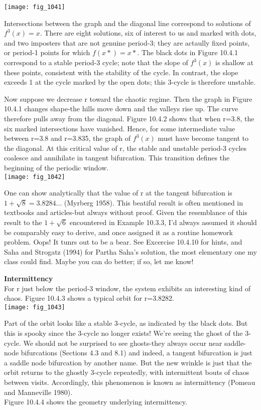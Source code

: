 \documentclass{article}
\newcommand\tab[1][1cm]{\hspace*{#1}}
\begin{document}
\texttt{[image: fig\_1041]}

Intersections between the graph and the diagonal line correspond to solutions of $f^{3}(x)=x$. There are eight solutions, six of interest to us and marked with dots, and two imposters that are not genuine period-3; they are actaully fixed points, or period-1 points for which $f(x*)=x*$. The black dots in Figure 10.4.1 correspond to a stable period-3 cycle; note that the slope of $f^{3}(x)$ is shallow at these points, consistent with the stability of the cycle. In contrast, the slope exceeds 1 at the cycle marked by the open dots; this 3-cycle is therefore unstable. \\ \tab

Now suppose we decrease r toward the chaotic regime. Then the graph in Figure 10.4.1 changes shape-the hills move down and the valleys rise up. The curve therefore pulls away from the diagonal. Figure 10.4.2 shows that when r=3.8, the six marked intersections have vanished. Hence, for some intermediate value between r=3.8 and r=3.835, the graph of $f^{3}(x)$ must have become tangent to the diagonal. At this critical value of r, the stable and unstable period-3 cycles coalesce and annihilate in tangent bifurcation. This transition defines the beginning of the periodic window. \\

\texttt{[image: fig\_1042]}

\tab One can show analytically that the value of r at the tangent bifurcation is $1+\sqrt{8}=3.8284$... (Myrberg 1958). This beatiful result is often mentioned in textbooks and articles-but always without proof. Given the resemblance of this result to the $1+\sqrt{6}$ encountered in Example 10.3.3, I'd always assumed it should be comparably easy to derive, and once assigned it as a routine homework problem. Oops! It tunrs out to be a bear. See Excercise 10.4.10 for hints, and Saha and Strogatz (1994) for Partha Saha's solution, the most elementary one my class could find. Maybe you can do better; if so, let me know! 

\textbf{Intermittency} \\
For r just below the period-3 window, the system exhibits an interesting kind of chaos. Figure 10.4.3 shows a typical orbit for r=3.8282. \\

\texttt{[image: fig\_1043]}

Part of the orbit looks like a stable 3-cycle, as indicated by the black dots. But this is spooky since the 3-cycle no longer exists! We're seeing the ghost of the 3-cycle. We should not be surprised to see ghosts-they always occur near saddle-node bifurcations (Sections 4.3 and 8.1) and indeed, a tangent bifurcation is just a saddle node bifurcation by another name. But the new wrinkle is just that the orbit returns to the ghostly 3-cycle repeatedly, with intermittent bouts of chaos between visits. Accordingly, this phenomenon is known as intermittency (Pomeau and Manneville 1980). \\ \tab
Figure 10.4.4 shows the geometry underlying intermittency. \\
\end{document}
